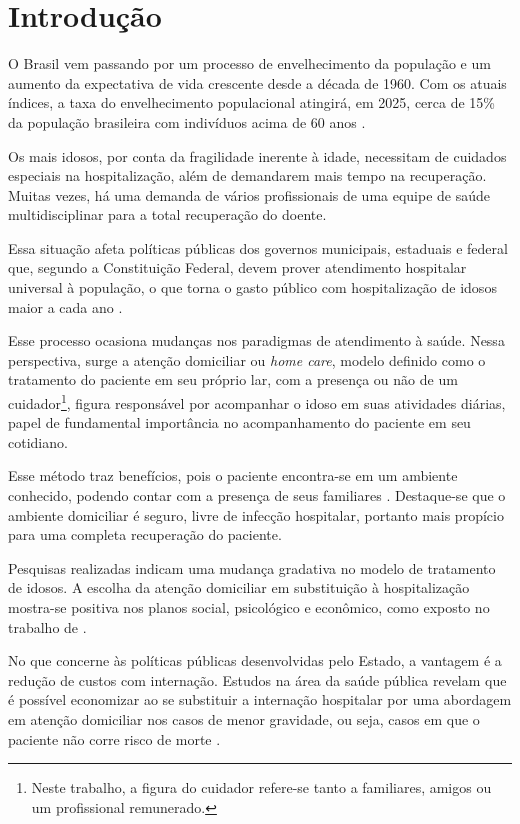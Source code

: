 \chapter{Introdução}\label{cap:introducao}

O Brasil vem passando por um processo de envelhecimento da população e
um aumento da expectativa de vida crescente desde a década de 1960. 
Com os atuais índices, a taxa do envelhecimento populacional atingirá, 
em 2025, cerca de 15\% da população brasileira com indivíduos acima 
de 60 anos \cite{gonccalves2006perfil}. 

Os mais idosos, por conta da fragilidade inerente à idade, necessitam de 
cuidados especiais na hospitalização, além de demandarem mais tempo na 
recuperação. Muitas vezes, há uma demanda de vários profissionais de uma equipe 
de saúde multidisciplinar para a total recuperação do doente.

Essa situação afeta políticas públicas dos governos municipais, estaduais e
federal que, segundo a Constituição Federal, devem prover atendimento
hospitalar universal à população, o que torna o gasto público com hospitalização
de idosos maior a cada ano \cite{da2013gastos}.

Esse processo ocasiona mudanças  nos paradigmas de atendimento à saúde. Nessa
perspectiva, surge a atenção domiciliar ou \textit{home care}, modelo definido
como o tratamento do paciente em seu próprio lar, com a presença ou não de um
cuidador\footnote{Neste trabalho, a figura do cuidador refere-se tanto a
familiares, amigos ou um profissional remunerado.}, figura responsável por
acompanhar o idoso em suas atividades diárias, papel de fundamental importância
no acompanhamento do paciente em seu cotidiano.

Esse método traz benefícios, pois o  paciente encontra-se em um ambiente
conhecido, podendo contar com a presença de seus familiares
\cite{hermann2007atendimento, day2010beneficios}. Destaque-se que o ambiente
domiciliar é seguro, livre de infecção hospitalar, portanto mais propício para
uma completa recuperação do paciente.

Pesquisas realizadas indicam uma mudança gradativa no modelo de tratamento
de idosos. A escolha da atenção domiciliar em substituição à hospitalização 
mostra-se positiva nos planos social, psicológico e econômico, como exposto
no trabalho de .

No que concerne às políticas públicas desenvolvidas pelo Estado,  a vantagem é
a redução de custos com internação. Estudos na área da saúde pública revelam
que é possível economizar ao se substituir a internação hospitalar por uma
abordagem em atenção domiciliar nos casos de menor gravidade, ou seja, casos
em que o paciente não corre risco de morte \cite{bourdette1993health}.  

